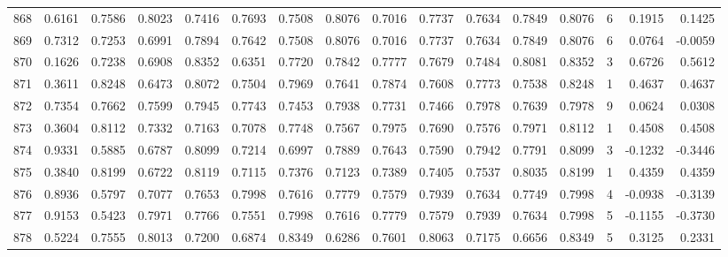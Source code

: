\begin{tabular}{lrrrrrrrrrrrrrrr}
868 &      0.6161 &  0.7586 &  0.8023 &  0.7416 &  0.7693 &  0.7508 &  0.8076 &  0.7016 &  0.7737 &  0.7634 &   0.7849 &     0.8076 &      6 &                    0.1915 &                     0.1425 \\
869 &      0.7312 &  0.7253 &  0.6991 &  0.7894 &  0.7642 &  0.7508 &  0.8076 &  0.7016 &  0.7737 &  0.7634 &   0.7849 &     0.8076 &      6 &                    0.0764 &                    -0.0059 \\
870 &      0.1626 &  0.7238 &  0.6908 &  0.8352 &  0.6351 &  0.7720 &  0.7842 &  0.7777 &  0.7679 &  0.7484 &   0.8081 &     0.8352 &      3 &                    0.6726 &                     0.5612 \\
871 &      0.3611 &  0.8248 &  0.6473 &  0.8072 &  0.7504 &  0.7969 &  0.7641 &  0.7874 &  0.7608 &  0.7773 &   0.7538 &     0.8248 &      1 &                    0.4637 &                     0.4637 \\
872 &      0.7354 &  0.7662 &  0.7599 &  0.7945 &  0.7743 &  0.7453 &  0.7938 &  0.7731 &  0.7466 &  0.7978 &   0.7639 &     0.7978 &      9 &                    0.0624 &                     0.0308 \\
873 &      0.3604 &  0.8112 &  0.7332 &  0.7163 &  0.7078 &  0.7748 &  0.7567 &  0.7975 &  0.7690 &  0.7576 &   0.7971 &     0.8112 &      1 &                    0.4508 &                     0.4508 \\
874 &      0.9331 &  0.5885 &  0.6787 &  0.8099 &  0.7214 &  0.6997 &  0.7889 &  0.7643 &  0.7590 &  0.7942 &   0.7791 &     0.8099 &      3 &                   -0.1232 &                    -0.3446 \\
875 &      0.3840 &  0.8199 &  0.6722 &  0.8119 &  0.7115 &  0.7376 &  0.7123 &  0.7389 &  0.7405 &  0.7537 &   0.8035 &     0.8199 &      1 &                    0.4359 &                     0.4359 \\
876 &      0.8936 &  0.5797 &  0.7077 &  0.7653 &  0.7998 &  0.7616 &  0.7779 &  0.7579 &  0.7939 &  0.7634 &   0.7749 &     0.7998 &      4 &                   -0.0938 &                    -0.3139 \\
877 &      0.9153 &  0.5423 &  0.7971 &  0.7766 &  0.7551 &  0.7998 &  0.7616 &  0.7779 &  0.7579 &  0.7939 &   0.7634 &     0.7998 &      5 &                   -0.1155 &                    -0.3730 \\
878 &      0.5224 &  0.7555 &  0.8013 &  0.7200 &  0.6874 &  0.8349 &  0.6286 &  0.7601 &  0.8063 &  0.7175 &   0.6656 &     0.8349 &      5 &                    0.3125 &                     0.2331 \\

\end{tabular}
